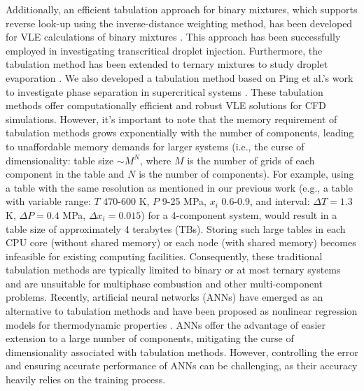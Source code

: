 Additionally, an efficient tabulation approach for binary mixtures, which supports reverse look-up using the inverse-distance weighting method, has been developed for VLE calculations of binary mixtures \cite{yi2019numerical,jafari2021towards,jafari2022exploring}. This approach has been successfully employed in investigating transcritical droplet injection. Furthermore, the tabulation method has been extended to ternary mixtures to study droplet evaporation \cite{gaballa2022numerical}. We also developed a tabulation method based on Ping et al.'s work \cite{yi2019numerical} to investigate phase separation in supercritical  systems \cite{zhang2022multicomponent}. These tabulation methods offer computationally efficient and robust VLE solutions for CFD simulations. However, it's important to note that the memory requirement of tabulation methods grows exponentially with the number of components, leading to unaffordable memory demands for larger systems (i.e., the curse of dimensionality: table size $\sim M^N$, where $M$ is the number of grids of each component in the table and $N$ is the number of components). For example, using a table with the same resolution as mentioned in our previous work (e.g., a table with variable range: $T$ 470-600 K, $P$ 9-25 MPa, $x_i$ 0.6-0.9, and interval: $\Delta T = 1.3$ K, $\Delta P = 0.4$ MPa, $\Delta x_i = 0.015$) \cite{zhang2022multicomponent} for a 4-component system, would result in a table size of approximately 4 terabytes (TBs). Storing such large tables in each CPU core (without shared memory) or each node (with shared memory) becomes infeasible for existing computing facilities. Consequently, these traditional tabulation methods are typically limited to binary or at most ternary systems and are unsuitable for multiphase combustion and other multi-component problems. Recently, artificial neural networks (ANNs) have emerged as an alternative to tabulation methods and have been proposed as nonlinear regression models for thermodynamic properties \cite{wang2019accelerating,koukouvinis2022machine}. ANNs offer the advantage of easier extension to a large number of components, mitigating the curse of dimensionality associated with tabulation methods. However, controlling the error and ensuring accurate performance of ANNs can be challenging, as their accuracy heavily relies on the training process.

